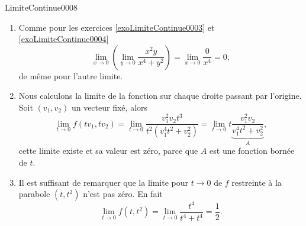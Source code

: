 \begin{corrige}{LimiteContinue0008}

  \begin{enumerate}
  \item  Comme pour les  exercices \ref{exoLimiteContinue0003} et \ref{exoLimiteContinue0004}
    \begin{equation}
      \lim_{x\to 0}\left(\lim_{y\to 0}\frac{x^2 y }{x^4 + y^2} \right)=\lim_{x\to 0}\frac{0}{x^4} = 0,
    \end{equation}
    de même pour l'autre limite. 
    \item Nous calculons la limite de la fonction sur chaque droite passant par l'origine. Soit $(v_1, v_2)$ un vecteur fixé, alors
      \begin{equation}
        \lim_{t\to 0}f(tv_1, tv_2)=\lim_{t\to 0}\frac{v_1^2v_2 t^3}{t^2(v_1^4t^2+v_2^2)}=\lim_{t\to 0} t \underbrace{\frac{v_1^2v_2}{v_1^4t^2+v_2^2}}_{A},
      \end{equation} 
      cette limite existe et sa valeur est zéro, parce que $A$ est une fonction bornée de $t$.
      \item Il est suffisant de remarquer que la limite  pour $t \to 0$ de $f$ restreinte à  la parabole $(t, t^2)$ n'est pas zéro. En fait
        \begin{equation}
        \lim_{t\to 0}f(t, t^2)=\lim_{t\to 0}\frac{t^4}{t^4+t^4}=\frac{1}{2}.
        \end{equation}    
  \end{enumerate}

\end{corrige}
